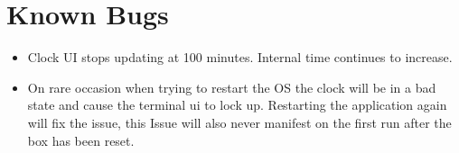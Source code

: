 \documentclass[pdftex,10pt,a4paper]{article}
\begin{document}
\section*{Known Bugs}

\begin{itemize}
\item Clock UI stops updating at 100 minutes. Internal time continues to 
	increase.
\item On rare occasion when trying to restart the OS the clock will be in a
	bad state and cause the terminal ui to lock up. Restarting the
	application again will fix the issue, this Issue will also never
	manifest on the first run after the box has been reset.
\end{itemize}
\end{document}
